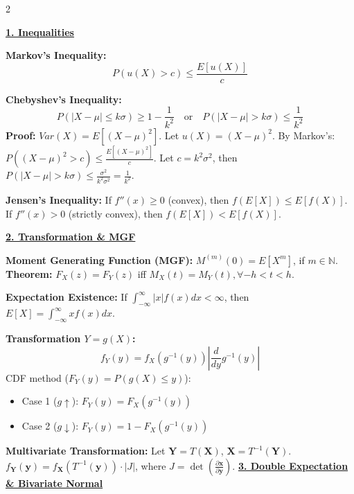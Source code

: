 \documentclass{article}
\title{}
\author{111020003 林群佑}
\date{}
\newcommand{\sectiontitle}[1]{\vspace{0.1cm}\textbf{\underline{#1}}\vspace{0.1cm}}
\newcommand{\distname}[1]{\textbf{#1}}
\begin{document}
\vspace{-1.5cm}

\begin{multicols*}{2}

\sectiontitle{1. Inequalities}

\distname{Markov's Inequality:}
\[ P(u(X) > c) \le \frac{E[u(X)]}{c} \]

\distname{Chebyshev's Inequality:}
\[ P(|X-\mu| \le k\sigma) \ge 1 - \frac{1}{k^2} \quad \text{or} \quad P(|X-\mu| > k\sigma) \le \frac{1}{k^2} \]
\textbf{Proof:} $Var(X) = E[(X-\mu)^2]$. Let $u(X)=(X-\mu)^2$. By Markov's:
$P((X-\mu)^2 > c) \le \frac{E[(X-\mu)^2]}{c}$.
Let $c = k^2\sigma^2$, then $P(|X-\mu| > k\sigma) \le \frac{\sigma^2}{k^2\sigma^2} = \frac{1}{k^2}$.

\distname{Jensen's Inequality:}
If $f''(x) \ge 0$ (convex), then $f(E[X]) \le E[f(X)]$.
If $f''(x) > 0$ (strictly convex), then $f(E[X]) < E[f(X)]$.

\sectiontitle{2. Transformation \& MGF}

\distname{Moment Generating Function (MGF):}
$M^{(m)}(0) = E[X^m]$, if $m \in \mathbb{N}$.
\textbf{Theorem:} $F_X(z) = F_Y(z)$ iff $M_X(t) = M_Y(t), \forall -h<t<h$.

\distname{Expectation Existence:}
If $\int_{-\infty}^{\infty} |x|f(x)dx < \infty$, then $E[X] = \int_{-\infty}^{\infty} xf(x)dx$.

\distname{Transformation $Y=g(X)$:}
\[ f_Y(y) = f_X(g^{-1}(y)) \left| \frac{d}{dy}g^{-1}(y) \right| \]
CDF method ($F_Y(y) = P(g(X) \le y)$):
\begin{itemize}
    \item Case 1 ($g \uparrow$): $F_Y(y) = F_X(g^{-1}(y))$
    \item Case 2 ($g \downarrow$): $F_Y(y) = 1 - F_X(g^{-1}(y))$
\end{itemize}
\distname{Multivariate Transformation:}
Let $\mathbf{Y} = T(\mathbf{X})$, $\mathbf{X} = T^{-1}(\mathbf{Y})$.
\\ $f_\mathbf{Y}(\mathbf{y}) = f_\mathbf{X}(T^{-1}(\mathbf{y})) \cdot |J|$, where $J = \det \left( \frac{\partial \mathbf{x}}{\partial \mathbf{y}} \right)$.
\sectiontitle{3. Double Expectation \& Bivariate Normal}


\end{multicols*}
\end{document}
